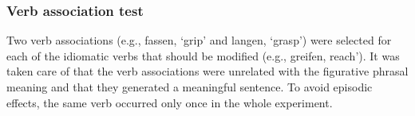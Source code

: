 \documentclass[output=paper]{langsci/langscibook}
\begin{document}
\begin{table}[]
\caption{\textit{Idiomatic Sentences and Stimulus Characteristics of the Idiomatic, Modified, and Unrelated Verb Constituents in Experiment 2.}}
\label{tab:exp2}
\end{table}

\subsubsection{Verb association test} 
Two verb associations (e.g., fassen, ‘grip’ and langen, ‘grasp’) were selected for each of the idiomatic verbs that should be modified (e.g., greifen, reach’). It was taken care of that the verb associations were unrelated with the figurative phrasal meaning and that they generated a meaningful sentence.  To avoid episodic effects, the same verb occurred only once in the whole experiment. 
\end{document}

